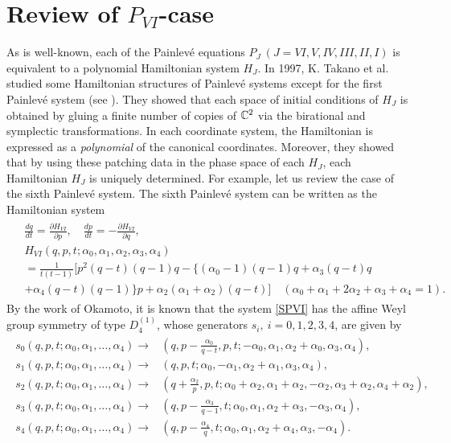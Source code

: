 \section{Review of $P_{VI}$-case}
As is well-known, each of the Painlev\'e equations $P_J \ (J=VI,V,IV,III,II,I)$ is equivalent to a polynomial Hamiltonian system $H_J$. In 1997, K. Takano et al. studied some Hamiltonian structures of Painlev\'e systems except for the first Painlev\'e system (see \cite{T1}). They showed that each space of initial conditions of $H_J$ is obtained by gluing a finite number of copies of ${\Bbb C}^2$ via the birational and symplectic transformations. In each coordinate system, the Hamiltonian is expressed as a {\it polynomial} of the canonical coordinates. Moreover, they showed that by using these patching data in the phase space of each $H_J$, each Hamiltonian $H_J$ is uniquely determined.
For example, let us review the case of the sixth Painlev\'e system. The sixth Painlev\'e system can be written as the Hamiltonian system
\begin{align}\label{SPVI}
\begin{split}
&\frac{dq}{dt}=\frac{\partial H_{VI}}{\partial p}, \quad \frac{dp}{dt}=-\frac{\partial H_{VI}}{\partial q},\\
&H_{VI}(q,p,t;\alpha_0,\alpha_1,\alpha_2,\alpha_3,\alpha_4)\\
&=\frac{1}{t(t-1)}[p^2(q-t)(q-1)q-\{(\alpha_0-1)(q-1)q+\alpha_3(q-t)q\\
&+\alpha_4(q-t)(q-1)\}p+\alpha_2(\alpha_1+\alpha_2)(q-t)] \quad (\alpha_0+\alpha_1+2\alpha_2+\alpha_3+\alpha_4=1).
\end{split}
\end{align}
By the work of Okamoto, it is known that the system \eqref{SPVI} has the affine Weyl group symmetry of type $D_4^{(1)}$, whose generators $s_i, \ i=0,1,2,3,4$, are given by
\begin{align}\label{D4}
\begin{split}
s_0(q,p,t;\alpha_0,\alpha_1,\dots,\alpha_4) \rightarrow &(q,p-\frac{\alpha_0}{q-t},p,t;-\alpha_0,\alpha_1,\alpha_2+\alpha_0,\alpha_3,\alpha_4),\\
s_1(q,p,t;\alpha_0,\alpha_1,\dots,\alpha_4) \rightarrow &(q,p,t;\alpha_0,-\alpha_1,\alpha_2+\alpha_1,\alpha_3,\alpha_4),\\
s_2(q,p,t;\alpha_0,\alpha_1,\dots,\alpha_4) \rightarrow &(q+\frac{\alpha_2}{p},p,t;\alpha_0+\alpha_2,\alpha_1+\alpha_2,-\alpha_2,\alpha_3+\alpha_2,\alpha_4+\alpha_2),\\
s_3(q,p,t;\alpha_0,\alpha_1,\dots,\alpha_4) \rightarrow &(q,p-\frac{\alpha_3}{q-1},t;\alpha_0,\alpha_1,\alpha_2+\alpha_3,-\alpha_3,\alpha_4),\\
s_4(q,p,t;\alpha_0,\alpha_1,\dots,\alpha_4) \rightarrow &(q,p-\frac{\alpha_4}{q},t;\alpha_0,\alpha_1,\alpha_2+\alpha_4,\alpha_3,-\alpha_4).
\end{split}
\end{align}
